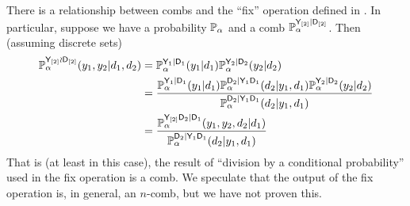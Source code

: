 There is a relationship between combs and the ``fix'' operation defined in \citet{richardson_nested_2017}. In particular, suppose we have a probability $\mathbb{P}_\alpha$ and a comb $\mathbb{P}_\alpha^{\mathsf{Y}_{[2]}|\mathsf{D}_{[2]}}$. Then (assuming discrete sets)
\begin{align}
    \mathbb{P}_\alpha^{\mathsf{Y}_{[2]}\wr \mathsf{D}_{[2]}}(y_1,y_2|d_1,d_2) &= \mathbb{P}_\alpha^{\mathsf{Y}_1|\mathsf{D}_1}(y_1|d_1)\mathbb{P}_\alpha^{\mathsf{Y}_2|\mathsf{D}_2}(y_2|d_2)\\
    &= \frac{\mathbb{P}_\alpha^{\mathsf{Y}_1|\mathsf{D}_1}(y_1|d_1)\mathbb{P}_\alpha^{\mathsf{D}_2|\mathsf{Y}_1\mathsf{D}_1}(d_2|y_1,d_1)\mathbb{P}_\alpha^{\mathsf{Y}_2|\mathsf{D}_2}(y_2|d_2)}{\mathbb{P}_\alpha^{\mathsf{D}_2|\mathsf{Y}_1\mathsf{D}_1}(d_2|y_1,d_1)}\\
    &= \frac{\mathbb{P}_\alpha^{\mathsf{Y}_{[2]}\mathsf{D}_2|\mathsf{D}_1}(y_1,y_2,d_2|d_1)}{\mathbb{P}_\alpha^{\mathsf{D}_2|\mathsf{Y}_1\mathsf{D}_1}(d_2|y_1,d_1)}
\end{align}
That is (at least in this case), the result of ``division by a conditional probability'' used in the fix operation is a comb. We speculate that the output of the fix operation is, in general, an $n$-comb, but we have not proven this.





